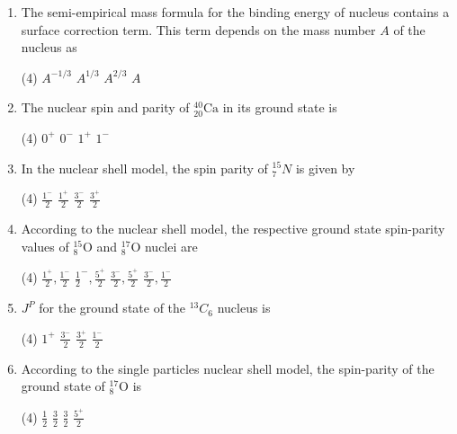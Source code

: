 \begin{enumerate}
	\item The semi-empirical mass formula for the binding energy of nucleus contains a surface correction term. This term depends on the mass number $A$ of the nucleus as
	{}
 \begin{tasks}(4)
	\task[\textbf{a.}]$A^{-1 / 3}$
	\task[\textbf{b.}]$A^{1 / 3}$
	\task[\textbf{c.}]$A^{2 / 3}$
	\task[\textbf{d.}] $A$
\end{tasks}
	\item  The nuclear spin and parity of ${ }_{20}^{40} \mathrm{Ca}$ in its ground state is
	{}
 \begin{tasks}(4)
	\task[\textbf{a.}]$0^{+}$
	\task[\textbf{b.}]$0^{-}$
	\task[\textbf{c.}]$1^{+}$
	\task[\textbf{d.}] $1^{-}$
\end{tasks}
	\item  In the nuclear shell model, the spin parity of ${ }_7^{15} N$ is given by
	{}
 \begin{tasks}(4)
	\task[\textbf{a.}]$\frac{1^{-}}{2}$
	\task[\textbf{b.}]$\frac{1^{+}}{2}$
	\task[\textbf{c.}]$\frac{3^{-}}{2}$
	\task[\textbf{d.}]$\frac{3^{+}}{2}$
\end{tasks}
	\item  According to the nuclear shell model, the respective ground state spin-parity values of ${ }_8^{15} \mathrm{O}$ and ${ }_8^{17} \mathrm{O}$ nuclei are
	{}
 \begin{tasks}(4)
	\task[\textbf{a.}]$\frac{1^{+}}{2}, \frac{1^{-}}{2}$
	\task[\textbf{b.}] $\frac{1}{2}^{-}, \frac{5^{+}}{2}$
	\task[\textbf{c.}]$\frac{3^{-}}{2}, \frac{5^{+}}{2}$
	\task[\textbf{d.}] $\frac{3^{-}}{2}, \frac{1^{-}}{2}$
\end{tasks}
	\item  $J^P$ for the ground state of the ${ }^{13} C_6$ nucleus is
	{}
 \begin{tasks}(4)
	\task[\textbf{a.}]$1^{+}$
	\task[\textbf{b.}]$\frac{3^{-}}{2}$
	\task[\textbf{c.}]$\frac{3^{+}}{2}$
	\task[\textbf{d.}]$\frac{1^{-}}{2}$ 
\end{tasks}
\item  According to the single particles nuclear shell model, the spin-parity of the ground state of ${ }_8^{17} \mathrm{O}$ is
{}
 \begin{tasks}(4)
	\task[\textbf{a.}]$\frac{1}{2}$
	\task[\textbf{b.}]$\frac{3}{2}$
	\task[\textbf{c.}]$\frac{3}{2}$
	\task[\textbf{d.}]$\frac{5^{+}}{2}$ 

\end{tasks}
\end{enumerate}
